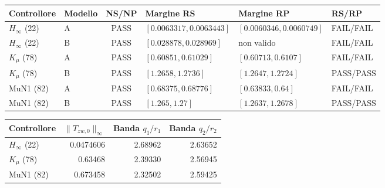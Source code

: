 \begin{center}\small
\begin{tabular}{llclll}\toprule
Controllore & Modello & NS/NP & Margine RS & Margine RP & RS/RP\\\midrule
$H_\infty$ (22) & A & PASS & $[0.0063317,0.0063443]$ & $[0.0060346,0.0060749]$ & FAIL/FAIL\\
$H_\infty$ (22) & B & PASS & $[0.028878,0.028969]$ & non valido & FAIL/FAIL\\
$K_\mu$ (78) & A & PASS & $[0.60851,0.61029]$ & $[0.60713,0.6107]$ & FAIL/FAIL\\
$K_\mu$ (78) & B & PASS & $[1.2658,1.2736]$ & $[1.2647,1.2724]$ & PASS/PASS\\
MuN1 (82) & A & PASS & $[0.68375,0.68776]$ & $[0.63833,0.64]$ & FAIL/FAIL\\
MuN1 (82) & B & PASS & $[1.265,1.27]$ & $[1.2637,1.2678]$ & PASS/PASS\\
\bottomrule\end{tabular}
\end{center}
\begin{center}\small
\begin{tabular}{lrrr}\toprule
Controllore & $\|T_{zw,0}\|_\infty$ & Banda $q_1/r_1$ & Banda $q_2/r_2$\\\midrule
$H_\infty$ (22) & 0.0474606 & 2.68962 & 2.63652\\
$K_\mu$ (78) & 0.63468 & 2.39330 & 2.56945\\
MuN1 (82) & 0.673458 & 2.32502 & 2.59425\\
\bottomrule\end{tabular}
\end{center}
